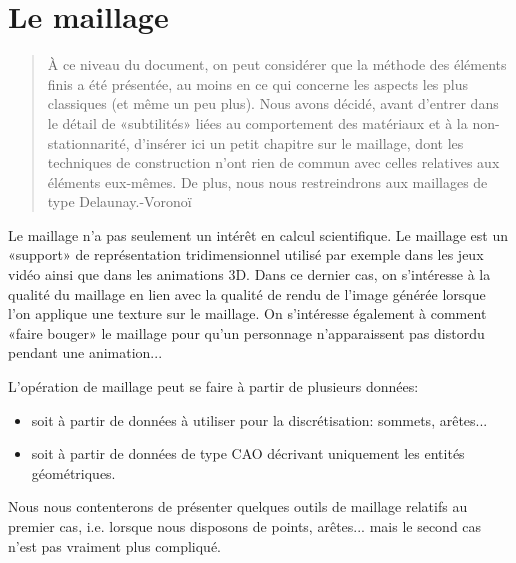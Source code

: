 \chapter{Le maillage}\label{Ch-mesh}
\begin{abstract}
À ce niveau du document, on peut considérer que la méthode des éléments finis a été présentée, au moins en ce qui concerne les aspects les plus classiques (et même un peu plus).
Nous avons décidé, avant d'entrer dans le détail de «subtilités» liées au comportement des matériaux et à la non-stationnarité, d'insérer ici un petit chapitre sur le maillage, dont les techniques de construction n'ont rien de commun avec celles relatives aux éléments eux-mêmes.
De plus, nous nous restreindrons aux maillages de type Delaunay.-Voronoï
\end{abstract}

Le maillage n'a pas seulement un intérêt en calcul scientifique. Le maillage est un «support» de représentation tridimensionnel utilisé par exemple dans les jeux vidéo ainsi que dans les animations 3D. Dans ce dernier cas, on s'intéresse à la qualité du maillage en lien avec la qualité de rendu de l'image générée lorsque l'on applique une texture sur le maillage. On s'intéresse également à comment «faire bouger» le maillage pour qu'un personnage n'apparaissent pas distordu pendant une animation...

\medskip
L'opération de maillage peut se faire à partir de plusieurs données:
\begin{itemize}
   \item soit à partir de données à utiliser pour la discrétisation: sommets, arêtes...
   \item soit à partir de données de type CAO décrivant uniquement les entités géométriques.
\end{itemize}
Nous nous contenterons de présenter quelques outils de maillage relatifs au premier cas, i.e. lorsque nous disposons de points, arêtes... mais le second cas n'est pas vraiment plus compliqué.


